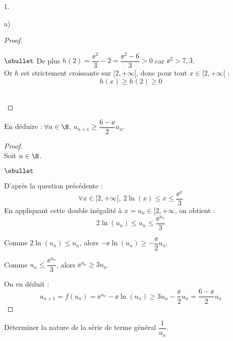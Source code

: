 \documentclass[11pt]{article}%
\begin{document}
\begin{noliste}{1.}
\begin{noliste}{a)}
\begin{proof}
\begin{noliste}{$\sbullet$}
        De plus $h(2)=\dfrac{\ee^2}{3}-2=\dfrac{\ee^2-6}{3}>0$ car
        $\ee^2>7,3$.\\
        Or $h$ est strictement croissante sur $[2,+\infty[$, donc pour
        tout $x\in[2,+\infty[$ : 
        \[
        h(x) \geq h(2) \geq 0
        \]
      \end{noliste}
      \conc{On en conclut : $\forall x\in[2,+\infty[$, $x \leq
        \dfrac{\ee^x}{3}$.}
      
      ~\\[-1.4cm]
    \end{proof}
    
  \item En déduire : $\forall n\in\N$, $u_{n+1} \geq
    \dfrac{6-\ee}{2}u_n$.
	
    \begin{proof}~\\
      Soit $n\in\N$. 
      \begin{noliste}{$\sbullet$}
      \item D'après la question précédente :
        \[
        \forall x\in[2,+\infty[, \ 2 \ln(x) \leq x \leq \dfrac{\ee^x}{3}
        \]
        En appliquant cette double inégalité à $x = u_n \in [2,
        +\infty$, on obtient :
        \[
        2\ln(u_n) \leq u_n \leq \dfrac{\ee^{u_n}}{3}
        \]

      \item Comme $2\ln(u_n) \leq u_n$, alors $-\ee \ln(u_n) \geq
        -\dfrac{\ee}{2}u_n$.
        
      \item Comme $u_n \leq \dfrac{\ee^{u_n}}{3}$, alors
        $\ee^{u_n}\geq 3u_n$.
      \end{noliste}
      On en déduit :
      \[
      u_{n+1} = f(u_n) = \ee^{u_n} - \ee \ln(u_n) \geq 3 u_n
      -\dfrac{\ee}{2} u_n = \dfrac{6-\ee}{2}u_n
      \]
    \end{proof}
    

	

  \item Déterminer la nature de la série de terme général
    $\dfrac{1}{u_n}$.
	

\end{noliste}
\end{noliste}
\end{document}
